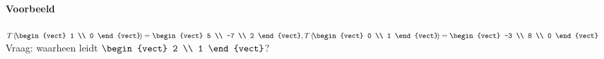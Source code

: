 \paragraph{Voorbeeld} $T\left(\!\begin{vect} 1 \\ 0 \end{vect}\!\right) = \begin{vect} 5 \\ -7 \\ 2 \end{vect}, T\left(\!\begin{vect} 0 \\ 1 \end{vect}\!\right) = \begin{vect} -3 \\ 8 \\ 0 \end{vect}$ Vraag: waarheen leidt $\begin{vect} 2 \\ 1 \end{vect}$?

